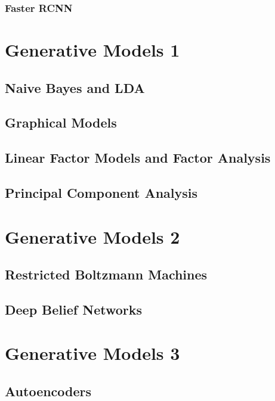 \documentclass{article}
\theoremstyle{definition}
\theoremstyle{remark}
\theoremstyle{definition}
\begin{document}
\subsubsection{Faster RCNN}


\section{Generative Models 1} 

\subsection{Naive Bayes and LDA} 

\subsection{Graphical Models}

\subsection{Linear Factor Models and Factor Analysis} 

\subsection{Principal Component Analysis} 


\section{Generative Models 2} 

\subsection{Restricted Boltzmann Machines} 

\subsection{Deep Belief Networks} 


\section{Generative Models 3} 

\subsection{Autoencoders} 
\end{document}
